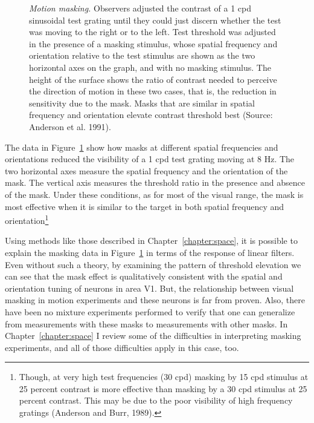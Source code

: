 \begin{figure}
\centerline{
}
\caption[Direction of Motion in the Presence of Masking Stimuli]{
{\em Motion masking.}  Observers adjusted the contrast of a 1 cpd
sinusoidal test grating until they could just discern whether the test
was moving to the right or to the left.  Test threshold was adjusted
in the presence of a masking stimulus, whose spatial frequency and
orientation relative to the test stimulus are shown as the two
horizontal axes on the graph, and with no masking stimulus.  The
height of the surface shows the ratio of contrast needed to perceive
the direction of motion in these two cases, that is, the reduction in
sensitivity due to the mask.  Masks that are similar in spatial
frequency and orientation elevate contrast threshold best (Source:
Anderson et al. 1991).  }
\label{f9:motionMask}
\end{figure}
The data in Figure~\ref{f9:motionMask} show how masks at different
spatial frequencies and orientations reduced the visibility of a 1 cpd
test grating moving at 8 Hz.  The two horizontal axes measure the
spatial frequency and the orientation of the mask.  The vertical axis
measures the threshold ratio in the presence and absence of the mask.
Under these conditions, as for most of the visual range, the mask is
most effective when it is similar to the target in both spatial
frequency and orientation\footnote{ Though, at very high test
frequencies (30 cpd) masking by 15 cpd stimulus at 25 percent contrast
is more effective than masking by a 30 cpd stimulus at 25 percent
contrast.  This may be due to the poor visibility of high frequency
gratings (Anderson and Burr, 1989).}

Using methods like those described in Chapter~\ref{chapter:space}, it
is possible to explain the masking data in Figure~\ref{f9:motionMask}
in terms of the response of linear filters.  Even without such a
theory, by examining the pattern of threshold elevation we can see
that the mask effect is qualitatively consistent with the spatial and
orientation tuning of neurons in area V1.  But, the relationship
between visual masking in motion experiments and these neurons is far
from proven.  Also, there have been no mixture experiments performed
to verify that one can generalize from measurements with these masks
to measurements with other masks.  In Chapter~\ref{chapter:space} I
review some of the difficulties in interpreting masking experiments,
and all of those difficulties apply in this case, too.

